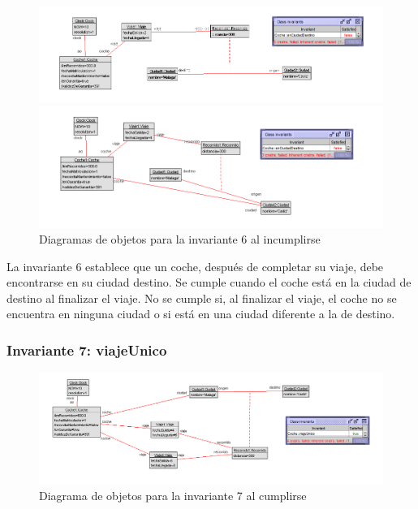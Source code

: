 \documentclass[12pt.a4paper]{article}
\begin{document}
    
 \begin{figure}[H]
    \centering
    \begin{minipage}{0.49\textwidth}
        \centering
        \includegraphics[width=1\linewidth]{Soils/6_v2.png}
    \end{minipage}
    \hfill
    \begin{minipage}{0.49\textwidth}
        \centering
        \includegraphics[width=1\linewidth]{Soils/6_v3.png}
    \end{minipage}
    \caption{Diagramas de objetos para la invariante 6 al incumplirse}
\end{figure}

La invariante 6 establece que un coche, después de completar su viaje, debe encontrarse en su ciudad destino. Se cumple cuando el coche está en la ciudad de destino al finalizar el viaje. No se cumple si, al finalizar el viaje, el coche no se encuentra en ninguna ciudad o si está en una ciudad diferente a la de destino.

\subsubsection{Invariante 7: viajeUnico}
    \begin{figure}[H]
         \centering
         \includegraphics[width=1\linewidth]{Soils/7.png}
         \caption{Diagrama de objetos para la invariante 7 al cumplirse}
    \end{figure}
\end{document}
